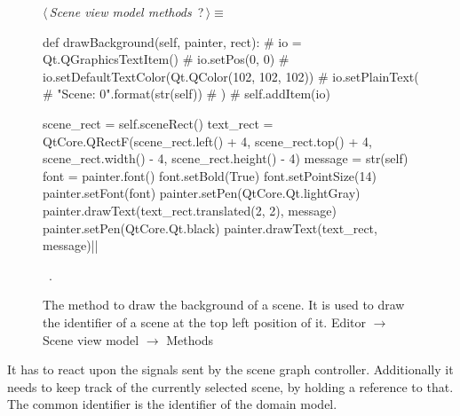 \documentclass[%
    a4paper,    %
    justified,  %
    nobib,      %
    openany     %
]{tufte-book}
\begin{document}
\begin{figure}
\begin{flushleft} \small
\begin{minipage}{\linewidth}\label{scrap91}\raggedright\small
{} $\langle\,${\itshape Scene view model methods}\nobreak\ {\footnotesize {?}}$\,\rangle\equiv$
\vspace{-1ex}
\begin{pythoncode}
def drawBackground(self, painter, rect):
    # io = Qt.QGraphicsTextItem()
    # io.setPos(0, 0)
    # io.setDefaultTextColor(Qt.QColor(102, 102, 102))
    # io.setPlainText(
    #     "Scene: {0}".format(str(self))
    # )
    # self.addItem(io)

    scene_rect = self.sceneRect()
    text_rect = QtCore.QRectF(scene_rect.left()   + 4,
                              scene_rect.top()    + 4,
                              scene_rect.width()  - 4,
                              scene_rect.height() - 4)
    message = str(self)
    font = painter.font()
    font.setBold(True)
    font.setPointSize(14)
    painter.setFont(font)
    painter.setPen(QtCore.Qt.lightGray)
    painter.drawText(text_rect.translated(2, 2), message)
    painter.setPen(QtCore.Qt.black)
    painter.drawText(text_rect, message)|\NWsep|
\end{pythoncode}
\vspace{1.5ex}
\footnotesize
\begin{list}{}{\setlength{\itemsep}{-\parsep}\setlength{\itemindent}{-\leftmargin}}
\item \NWtxtMacroRefIn\ .

\item{}
\end{list}
\end{minipage}\vspace{4ex}
\end{flushleft}
\caption{The method to draw the background of a scene. It is used to draw the
  identifier of a scene at the top left position of it.
  \newline{}\newline{}Editor $\rightarrow$ Scene view model $\rightarrow$
  Methods}
\label{editor:lst:scene-view-model:methods:draw-background}
\end{figure}

 It has to
react upon the signals sent by the scene graph controller. Additionally it needs
to keep track of the currently selected scene, by holding a reference to that.
The common identifier is the identifier of the domain model.
\end{document}
